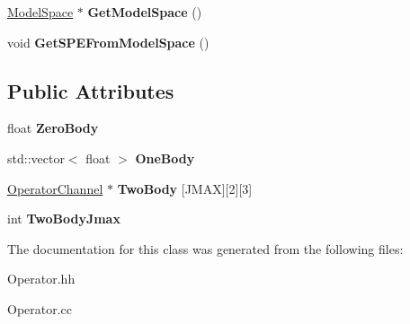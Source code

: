 \begin{DoxyCompactItemize}
\item 
\hypertarget{classOperator_a640785d62193b805723eb8211b9dff44}{\hyperlink{classModelSpace}{Model\-Space} $\ast$ {\bfseries Get\-Model\-Space} ()}\label{classOperator_a640785d62193b805723eb8211b9dff44}

\item 
\hypertarget{classOperator_a88af8c612293573e941df797b240bb91}{void {\bfseries Get\-S\-P\-E\-From\-Model\-Space} ()}\label{classOperator_a88af8c612293573e941df797b240bb91}

\end{DoxyCompactItemize}
\subsection*{Public Attributes}
\begin{DoxyCompactItemize}
\item 
\hypertarget{classOperator_abf78a550ee8b0015ae8331083ec78cc8}{float {\bfseries Zero\-Body}}\label{classOperator_abf78a550ee8b0015ae8331083ec78cc8}

\item 
\hypertarget{classOperator_a4a6602e3321aeb0b2306f40cb5dac50a}{std\-::vector$<$ float $>$ {\bfseries One\-Body}}\label{classOperator_a4a6602e3321aeb0b2306f40cb5dac50a}

\item 
\hypertarget{classOperator_ad6e1bfdec2e4bc71c96dcd4f8229dde6}{\hyperlink{classOperatorChannel}{Operator\-Channel} $\ast$ {\bfseries Two\-Body} \mbox{[}J\-M\-A\-X\mbox{]}\mbox{[}2\mbox{]}\mbox{[}3\mbox{]}}\label{classOperator_ad6e1bfdec2e4bc71c96dcd4f8229dde6}

\item 
\hypertarget{classOperator_a3354ffab028908e806d274420cb920f0}{int {\bfseries Two\-Body\-Jmax}}\label{classOperator_a3354ffab028908e806d274420cb920f0}

\end{DoxyCompactItemize}


The documentation for this class was generated from the following files\-:\begin{DoxyCompactItemize}
\item 
Operator.\-hh\item 
Operator.\-cc\end{DoxyCompactItemize}
